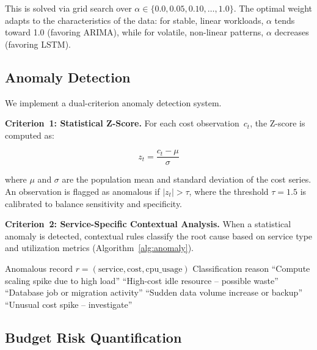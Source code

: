\documentclass[conference]{IEEEtran}
\begin{document}
This is solved via grid search over $\alpha \in \{0.0, 0.05, 0.10, \ldots, 1.0\}$. The optimal weight adapts to the characteristics of the data: for stable, linear workloads, $\alpha$ tends toward 1.0 (favoring ARIMA), while for volatile, non-linear patterns, $\alpha$ decreases (favoring LSTM).

\subsection{Anomaly Detection}

We implement a dual-criterion anomaly detection system.

\textbf{Criterion~1: Statistical Z-Score.} For each cost observation~$c_t$, the Z-score is computed as:

\begin{equation}
z_t = \frac{c_t - \mu}{\sigma}
\label{eq:zscore}
\end{equation}

\noindent where $\mu$ and $\sigma$ are the population mean and standard deviation of the cost series. An observation is flagged as anomalous if $|z_t| > \tau$, where the threshold $\tau = 1.5$ is calibrated to balance sensitivity and specificity.

\textbf{Criterion~2: Service-Specific Contextual Analysis.} When a statistical anomaly is detected, contextual rules classify the root cause based on service type and utilization metrics (Algorithm~\ref{alg:anomaly}).

\begin{algorithm}[htbp]
\caption{Contextual Anomaly Classification}
\label{alg:anomaly}
\begin{algorithmic}[1]
\REQUIRE Anomalous record $r = (\text{service}, \text{cost}, \text{cpu\_usage})$
\ENSURE Classification reason
        \RETURN ``Compute scaling spike due to high load''
        \RETURN ``High-cost idle resource -- possible waste''
    \ENDIF
{}
    \RETURN ``Database job or migration activity''
    \RETURN ``Sudden data volume increase or backup''
\ELSE
    \RETURN ``Unusual cost spike -- investigate''
\ENDIF
\end{algorithmic}
\end{algorithm}

\subsection{Budget Risk Quantification}
\end{document}
